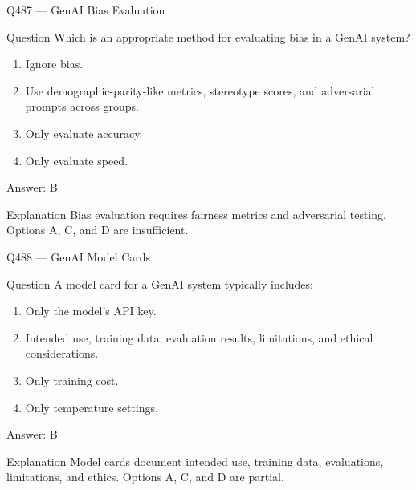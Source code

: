 \documentclass[aspectratio=169,8pt]{beamer}
\begin{document}
	\begin{frame}{Q487 --- GenAI Bias Evaluation}
		\begin{block}{Question}
			Which is an appropriate method for evaluating bias in a GenAI system?
			\begin{enumerate}
				\item Ignore bias.
				\item Use demographic-parity-like metrics, stereotype scores, and adversarial prompts across groups.
				\item Only evaluate accuracy.
				\item Only evaluate speed.
			\end{enumerate}
		\end{block}
		\begin{exampleblock}{Answer: B}\end{exampleblock}
		\begin{block}{Explanation}
			Bias evaluation requires fairness metrics and adversarial testing. Options A, C, and D are insufficient.
		\end{block}
	\end{frame}
	
	\begin{frame}{Q488 --- GenAI Model Cards}
		\begin{block}{Question}
			A model card for a GenAI system typically includes:
			\begin{enumerate}
				\item Only the model's API key.
				\item Intended use, training data, evaluation results, limitations, and ethical considerations.
				\item Only training cost.
				\item Only temperature settings.
			\end{enumerate}
		\end{block}
		\begin{exampleblock}{Answer: B}\end{exampleblock}
		\begin{block}{Explanation}
			Model cards document intended use, training data, evaluations, limitations, and ethics. Options A, C, and D are partial.
		\end{block}
	\end{frame}
	
\end{document}
